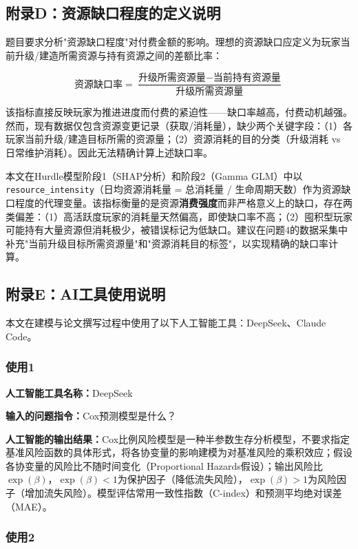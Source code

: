 \subsection{附录D：资源缺口程度的定义说明}

题目要求分析"资源缺口程度"对付费金额的影响。理想的资源缺口应定义为玩家当前升级/建造所需资源与持有资源之间的差额比率：

\begin{equation}
\text{资源缺口率} = \frac{\text{升级所需资源量} - \text{当前持有资源量}}{\text{升级所需资源量}}
\end{equation}

该指标直接反映玩家为推进进度而付费的紧迫性——缺口率越高，付费动机越强。然而，现有数据仅包含资源变更记录（获取/消耗量），缺少两个关键字段：（1）各玩家当前升级/建造目标所需的资源量；（2）资源消耗的目的分类（升级消耗 vs 日常维护消耗）。因此无法精确计算上述缺口率。

本文在Hurdle模型阶段1（SHAP分析）和阶段2（Gamma GLM）中以\texttt{resource\_intensity}（日均资源消耗量 = 总消耗量 / 生命周期天数）作为资源缺口程度的代理变量。该指标衡量的是资源\textbf{消费强度}而非严格意义上的缺口，存在两类偏差：（1）高活跃度玩家的消耗量天然偏高，即使缺口率不高；（2）囤积型玩家可能持有大量资源但消耗极少，被错误标记为低缺口。建议在问题4的数据采集中补充"当前升级目标所需资源量"和"资源消耗目的标签"，以实现精确的缺口率计算。

\subsection{附录E：AI工具使用说明}

本文在建模与论文撰写过程中使用了以下人工智能工具：DeepSeek、Claude Code。

\subsubsection{使用1}

\textbf{人工智能工具名称：}DeepSeek

\textbf{输入的问题指令：}Cox预测模型是什么？

\textbf{人工智能的输出结果：}Cox比例风险模型是一种半参数生存分析模型，不要求指定基准风险函数的具体形式，将各协变量的影响建模为对基准风险的乘积效应；假设各协变量的风险比不随时间变化（Proportional Hazards假设）；输出风险比$\exp(\beta)$，$\exp(\beta)<1$为保护因子（降低流失风险），$\exp(\beta)>1$为风险因子（增加流失风险）。模型评估常用一致性指数（C-index）和预测平均绝对误差（MAE）。

\subsubsection{使用2}

